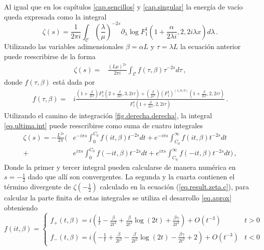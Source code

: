 Al igual que en los capítulos \ref{cap.sencillos}  y \ref{cap.singular} la energía de vacío queda expresada como la integral
\begin{equation}
	\zeta (s) = 
	\frac{1}{2 \pi i} \int _{\mathcal{C}} 
						\left( \frac{\lambda}{\mu} \right) ^{-2s}
						\partial _ \lambda 
						\log F _1 ^{1} 
						\left( 1+\frac{ \alpha}{2 \lambda i },
							2,2 i \lambda x 
							\right)												
						d \lambda
	\, .
\end{equation}
Utilizando las variables adimensionales $\beta = \alpha L$ y  $\tau = \lambda L$ la ecuación anterior puede reescribirse de la forma
\begin{align}
\label{eq.ultima.int}
	\zeta (s) =& 
	\frac{\left(L \mu \right)^{2s}}{2 \pi i} \int _{\mathcal{C}} 
	f (\tau , \beta) \tau ^{-2s} d \tau 
\, ,
\end{align}
donde $f( \tau, \beta)$ está dada por
\begin{align}
f(\tau, \beta) =& 	
i
\frac{
		\left(1 + \frac{ \beta}{2 i \tau} \right) 
		F _1 ^1 
			\left( 2 + \frac{ \beta}{2 i \tau} ,3 ,2 i \tau \right)
		+ \left( \frac{\beta				
				}
				{2 \tau ^2 } 
				\right)
				( F _{1} ^1 ) ^{(1,0,0)}
				\left( 1 + \frac{\beta}{2 i \tau} ,2 ,2 i \tau
						\right)
		}
		{F _1 ^1 \left( 1 + \frac{\beta}{2 i \tau},2,2 i \tau \right)} 
\, .		
\nonumber
\end{align}
Utilizando el camino de integración \ref{fig.derecha.derecha}, la integral \ref{eq.ultima.int} puede reescribirse como suma de cuatro integrales
\begin{align*}
\zeta (s) = 
- \frac{L ^{2s}}{2 \pi } 
\Bigg(&	  e ^{- i \pi s} \int _0 ^{C _0}
			f (i t,\beta )
			t ^{-2s}  dt 
		+ e ^{- i \pi s} \int _{C _0} ^{\infty}
			f (i t,\beta )
			t ^{-2s}  dt \\
		+&e ^{i \pi s} \int _{0} ^{C _0} 
			f (-i t,\beta )
			t ^{-2s}  dt 
		+ e ^{i \pi s} \int _{C _0} ^{\infty}
			f (-i t,\beta )
			t ^{-2s}  dt 
	\Bigg)
\, ,
\end{align*}
Donde la primer y tercer integral pueden calcularse de manera numérica en $s= -\frac{1}{2}$ dado que allí son convergentes. La segunda y la cuarta contienen el término divergente de $\zeta \left(- \frac{1}{2} \right)$ calculado en la ecuación (\ref{eq.result.zeta.c}), para calcular la parte finita de estas integrales se utiliza el desarrollo \ref{eq.aprox} obteniendo
\[ 
f   ( i t ,\beta )=
\begin{cases} 
	  f _{+} ( t, \beta) = 
	  i  \left(
			\frac{1}{t} - \frac{\beta}{2 t ^2 } + \frac{\beta}{2 t^2}
			\log (2 t) + \frac{\beta \gamma}{2 t^2} 
			\right) + O (t ^{-3})
	  & t > 0 \\
	  f _{-} ( t, \beta) =
      i  \left(
			- \frac{1}{t} + \frac{\beta}{2 t ^2 } - \frac{\beta}{2 t^2}
			\log (2 t) - \frac{\beta \gamma}{2 t^2} +2
			\right) + O (t ^{-3})
      & t < 0
   \end{cases}   
\]
